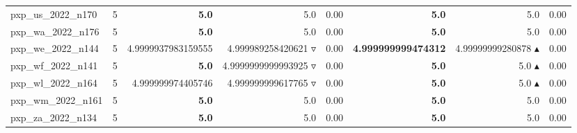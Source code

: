 \begin{table}[]
{\begin{tabular}{ll@{\hspace{1.2cm}}rrr@{\hspace{1.2cm}}rrr}
pxp_us_2022_n170 & 5 & \textbf{5.0} & 5.0 \phantom{$\blacktriangle$} & 0.00 & \textbf{5.0} & 5.0 \phantom{$\blacktriangle$} & 0.00 \\
pxp_wa_2022_n176 & 5 & \textbf{5.0} & 5.0 \phantom{$\blacktriangle$} & 0.00 & \textbf{5.0} & 5.0 \phantom{$\blacktriangle$} & 0.00 \\
pxp_we_2022_n144 & 5 & 4.9999937983159555 & 4.999989258420621 $\triangledown$ & 0.00 & \textbf{4.999999999474312} & 4.99999999280878 $\blacktriangle$ & 0.00 \\
pxp_wf_2022_n141 & 5 & \textbf{5.0} & 4.9999999999993925 $\triangledown$ & 0.00 & \textbf{5.0} & 5.0 $\blacktriangle$ & 0.00 \\
pxp_wl_2022_n164 & 5 & 4.999999974405746 & 4.999999999617765 $\triangledown$ & 0.00 & \textbf{5.0} & 5.0 $\blacktriangle$ & 0.00 \\
pxp_wm_2022_n161 & 5 & \textbf{5.0} & 5.0 \phantom{$\blacktriangle$} & 0.00 & \textbf{5.0} & 5.0 \phantom{$\blacktriangle$} & 0.00 \\
pxp_za_2022_n134 & 5 & \textbf{5.0} & 5.0 \phantom{$\blacktriangle$} & 0.00 & \textbf{5.0} & 5.0 \phantom{$\blacktriangle$} & 0.00 \\
\bottomrule
    \end{tabular}
    }
\end{table}
